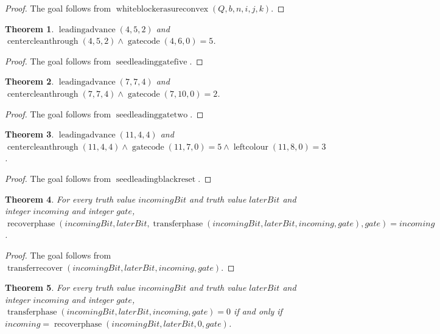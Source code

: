 \documentclass[11pt]{article}
\newtheorem{theorem}{Theorem}[section]
\theoremstyle{definition}
\begin{document}
\begin{proof}
The goal follows from \(\operatorname{whiteblockerasureconvex}(Q, b, n, i, j, k)\).
\end{proof}
\begin{theorem}
\label{ll:observations:seed-leading-gate-five}
\(\operatorname{leadingadvance}(4, 5, 2)\) and \(\operatorname{centercleanthrough}(4, 5, 2) \land \operatorname{gatecode}(4, 6, 0) = 5\).
\end{theorem}
\begin{proof}
The goal follows from \(\operatorname{seedleadinggatefive}\).
\end{proof}
\begin{theorem}
\label{ll:observations:seed-leading-gate-two}
\(\operatorname{leadingadvance}(7, 7, 4)\) and \(\operatorname{centercleanthrough}(7, 7, 4) \land \operatorname{gatecode}(7, 10, 0) = 2\).
\end{theorem}
\begin{proof}
The goal follows from \(\operatorname{seedleadinggatetwo}\).
\end{proof}
\begin{theorem}
\label{ll:observations:seed-leading-black-reset}
\(\operatorname{leadingadvance}(11, 4, 4)\) and \(\operatorname{centercleanthrough}(11, 4, 4) \land \operatorname{gatecode}(11, 7, 0) = 5 \land \operatorname{leftcolour}(11, 8, 0) = 3\).
\end{theorem}
\begin{proof}
The goal follows from \(\operatorname{seedleadingblackreset}\).
\end{proof}
\begin{theorem}
\label{ll:observations:transfer-recover}
For every truth value \(incomingBit\) and truth value \(laterBit\) and integer \(incoming\) and integer \(gate\), \(\operatorname{recoverphase}(incomingBit, laterBit, \operatorname{transferphase}(incomingBit, laterBit, incoming, gate), gate) = incoming\).
\end{theorem}
\begin{proof}
The goal follows from \(\operatorname{transferrecover}(incomingBit, laterBit, incoming, gate)\).
\end{proof}
\begin{theorem}
\label{ll:observations:transfer-kernel}
For every truth value \(incomingBit\) and truth value \(laterBit\) and integer \(incoming\) and integer \(gate\), \(\operatorname{transferphase}(incomingBit, laterBit, incoming, gate) = 0\) if and only if \(incoming = \operatorname{recoverphase}(incomingBit, laterBit, 0, gate)\).
\end{theorem}
\end{document}
